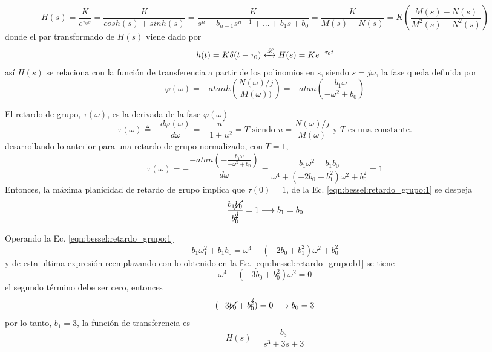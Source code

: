 \documentclass[informe.tex]{subfiles}
\begin{document}
	$$
		H(s)= 
 			\frac{K}{e^{\tau_0 s}} 
		    =
		      \frac{K}{cosh(s)+sinh(s)}
		    =
		      \frac{K}{s^n + b_{n-1}s^{n-1} + ... + b_1 s + b_0}
		    = 
		      \frac{K}{M(s)+N(s)}
 			= K \left( 
		     		\frac{M(s)-N(s)}{M^2(s)-N^2(s)}
		     	\right)		   		     
	$$
donde el par transformado de $H(s)$ viene dado por
	$$
		h(t) = K \delta(t - \tau_0) 
            \xleftrightarrow[]{\mathscr{L}}
		H(s) = K e^{-\tau_0 t}
	$$
así $H(s)$ se relaciona con la función de transferencia a partir de los polinomios en s, siendo $s=j \omega$, la fase queda definida por
   \begin{equation}
		\label{eqn:bessel:fase:1} 
		\varphi(\omega)= - atanh \left(\frac{N(\omega)/j}{M(\omega))} \right)
			               = - atan \left(
			                            \frac{b_1 \omega}{ -\omega^2 + b_0}
			                       \right)
	\end{equation}
	
El retardo de grupo,  $\tau(\omega)$,  es la derivada de la fase $\varphi(\omega)$
		$$
			\tau(\omega) \triangleq -\frac{ d \varphi (\omega)}
			               { d \omega}
			        = - \frac{u'}{1+u^2} =T   \mbox{ siendo } u=\frac{N(\omega)/j} {M(\omega)} \mbox{ y } T \mbox{ es una constante.}
		$$
desarrollando lo anterior para una retardo de grupo normalizado, con $T=1$,
   \begin{equation}
		\label{eqn:bessel:retardo_grupo:1} 
		\tau(\omega) = - \frac{ -atan \left( 
		                      -\frac{b_1 \omega}{-\omega^2 +b_0}
		                              \right)}
		                     { d\omega}
		             = \frac{b_1 \omega^2 + b_1 b_0}
                    {\omega^4 + (-2 b_0 + b_1^ 2)\omega^2 + b_0^2}
                    = 1
	\end{equation}
Entonces, la máxima planicidad de retardo de grupo implica que $\tau(0)=1$, de la Ec. \ref{eqn:bessel:retardo_grupo:1} se despeja 
	\begin{equation}
		\label{eqn:bessel:retardo_grupo:b1} 
		\frac{b_1 \cancel{b_0}}{b_0^{\cancel{2}}}=1 \longrightarrow b_1=b_0
	\end{equation}

Operando la Ec. \ref{eqn:bessel:retardo_grupo:1}	
	$$
		b_1 \omega_1^2 + b_1 b_0 = \omega^4 + (-2 b_0 + b_1^2) \omega^2 + b_0^2
	$$	
y de esta ultima expresión reemplazando con lo obtenido en la Ec. \ref{eqn:bessel:retardo_grupo:b1} se tiene 
	$$
		\omega^4 + (-3 b_0 + b_0^2) \omega^2 = 0
	$$
el segundo término debe ser cero, entonces
	\begin{equation}
		\label{eqn:bessel:retardo_grupo:b0} 
		(-3 \cancel{b_0} + b_0^{\cancel{2}})=0 \longrightarrow b_0=3
	\end{equation}
por lo tanto, $b_1=3$, la función de transferencia es
	\begin{equation}
		\label{eqn:bessel:retardo_grupo:b0} 
		H(s)=\frac{b_3}{s^3 + 3 s + 3}
	\end{equation}	
	
\end{document}
